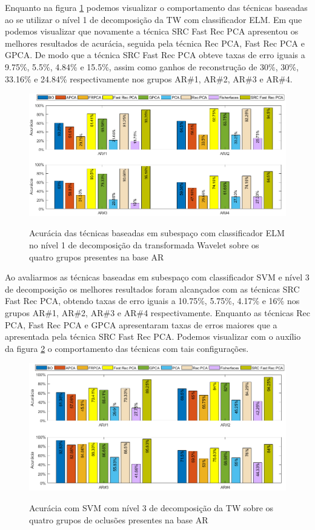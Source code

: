 Enquanto na figura \ref{fig:acuracia_ELM_AR_nivel1_subespaco} podemos visualizar o comportamento das técnicas baseadas ao se utilizar o nível 1 de decomposição da TW com classificador ELM. Em que podemos visualizar que novamente a técnica SRC Fast Rec PCA apresentou os melhores resultados de acurácia, seguida pela técnica Rec PCA, Fast Rec PCA e GPCA. De modo que a técnica SRC Fast Rec PCA obteve taxas de erro iguais a 9.75\%, 5.5\%, 4.84\% e 15.5\%, assim como ganhos de reconstrução de 30\%, 30\%, 33.16\% e 24.84\% respectivamente nos grupos AR\#1, AR\#2, AR\#3 e AR\#4. 


\begin{figure}[H]
\centering
\caption{Acurácia das técnicas baseadas em subespaço com classificador ELM no nível 1 de decomposição da transformada Wavelet sobre os quatro grupos presentes na base AR}
\includegraphics[scale=0.60]{imgs4/acuracia/nivel_one_two/ELM_nivel_1_subespaco}
\label{fig:acuracia_ELM_AR_nivel1_subespaco}
\end{figure}


Ao avaliarmos as técnicas baseadas em subespaço com classificador SVM e nível 3 de decomposição os melhores resultados foram alcançados com as técnicas SRC Fast Rec PCA, obtendo taxas de erro iguais a 10.75\%, 5.75\%, 4.17\% e 16\% nos grupos AR\#1, AR\#2, AR\#3 e AR\#4 respectivamente. Enquanto as técnicas Rec PCA, Fast Rec PCA e GPCA apresentaram taxas de erros maiores que a apresentada pela técnica SRC Fast Rec PCA. Podemos visualizar com o auxílio da figura \ref{fig:acuracia_SVM_AR_4_grupos} o comportamento das técnicas com tais configurações.	

\begin{figure}[H]
\centering
\caption{Acurácia com SVM com nível 3 de decomposição da TW sobre os quatro grupos de oclusões presentes na base AR}
\includegraphics[scale=0.60]{imgs4/acuracia_subespaco_SVM}
\label{fig:acuracia_SVM_AR_4_grupos}
\end{figure}

